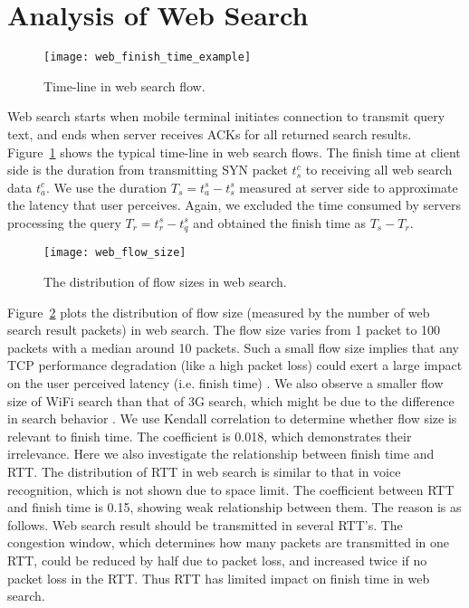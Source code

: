 
\section{Analysis of Web Search}
\label{sec:web_search}

\begin{figure}[th]
\centering
	\texttt{[image: web\_finish\_time\_example]}
\caption{Time-line in web search flow.}
\label{fig:web_finish_time_example}
\end{figure}

Web search starts when mobile terminal initiates connection to transmit query text, and ends when server receives ACKs for all returned search results. Figure~\ref{fig:web_finish_time_example} shows the typical time-line in web search flows. The finish time at client side is the duration from transmitting SYN packet $t^c_s$ to receiving all web search data $t^c_a$. We use the duration $T_s=t^s_a - t^s_s$ measured at server side to approximate the latency that user perceives. Again, we excluded the time consumed by servers processing the query $T_r=t^s_r - t^s_q$ and obtained the finish time as $T_s-T_r$.

\begin{figure}[th]
\centering
	\texttt{[image: web\_flow\_size]}
\caption{The distribution of flow sizes in web search.}
\label{fig:web_flow_size}
\end{figure}

Figure~\ref{fig:web_flow_size} plots the distribution of flow size (measured by the number of web search result packets) in web search. The flow size varies from 1 packet to 100 packets with a median around 10 packets. Such a small flow size implies that any TCP performance degradation (like a high packet loss) could exert a large impact on the user perceived latency (i.e. finish time) \cite{flach2013reducing}. We also observe a smaller flow size of WiFi search than that of 3G search, which might be due to the difference in search behavior \cite{Song:2013:EEU:2488388.2488493}. We use Kendall correlation to determine whether flow size is relevant to finish time. The coefficient is 0.018, which demonstrates their irrelevance. Here we also investigate the relationship between finish time and RTT. The distribution of RTT in web search is similar to that in voice recognition, which is not shown due to space limit. The coefficient between RTT and finish time is 0.15, showing weak relationship between them. The reason is as follows. Web search result should be transmitted in several RTT's. The congestion window, which determines how many packets are transmitted in one RTT, could be reduced by half due to packet loss, and increased twice if no packet loss in the RTT. Thus RTT has limited impact on finish time in web search. 

